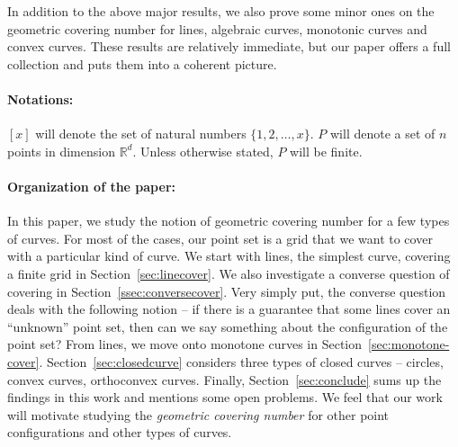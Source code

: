 \documentclass[
final
]{dmtcs-episciences}
\numberwithin{equation}{subsection}
\newcommand{\R}{\mathbb{R}}
\newcommand{\remove}[1]{}
\begin{document}
\remove{
	\newtheorem*{thm:line-converse}{Theorem \ref{thm:line-converse}}
	\begin{thm:line-converse}
		There exists a finite set $P$ of $n^2$ points in $\mathbb{R}^2$ which can be covered with $n$ lines but no subset of $P$ of size $\Omega (n^2)$ can be contained in a projective transformation of a rectangular grid of size $o(n^3)$.
	\end{thm:line-converse}
}
In addition to the above major results, we also prove some minor ones on the geometric covering number for lines, algebraic curves, monotonic curves and convex curves. These results are relatively immediate, but our paper offers a full collection and puts them into a coherent picture.



\medskip 



\paragraph*{Notations:} $[x]$ will denote the set of natural numbers $\{1, 2, \ldots, x\}$. $P$ will denote a set of $n$ points in dimension $\R^d$. Unless otherwise stated, $P$ will be finite. 

\medskip

\paragraph*{Organization of the paper:} In this paper, we study the notion of geometric covering number for a few types of curves. For most of the cases, our point set is a grid that we want to cover with a particular kind of curve. We start with lines, the simplest curve, covering a finite grid in Section~\ref{sec:linecover}. We also investigate a converse question of covering in Section~\ref{ssec:conversecover}. Very simply put, the converse question deals with the following notion -- if there is a guarantee that some lines cover an ``unknown'' point set, then can we say something about the configuration of the point set? From lines, we move onto monotone curves in Section~\ref{sec:monotone-cover}. Section~\ref{sec:closedcurve} considers three types of closed curves -- circles, convex curves, orthoconvex curves. \remove{Section~\ref{sec:non-congruent} brings into focus covering with non-congruent curves. In Section~\ref{sec:smallcurve}, we study covering by some small curves.}Finally, Section~\ref{sec:conclude} sums up the findings in this work and mentions some open problems. We feel that our work will motivate studying the \emph{geometric covering number} for other point configurations and other types of curves. 
\end{document}
